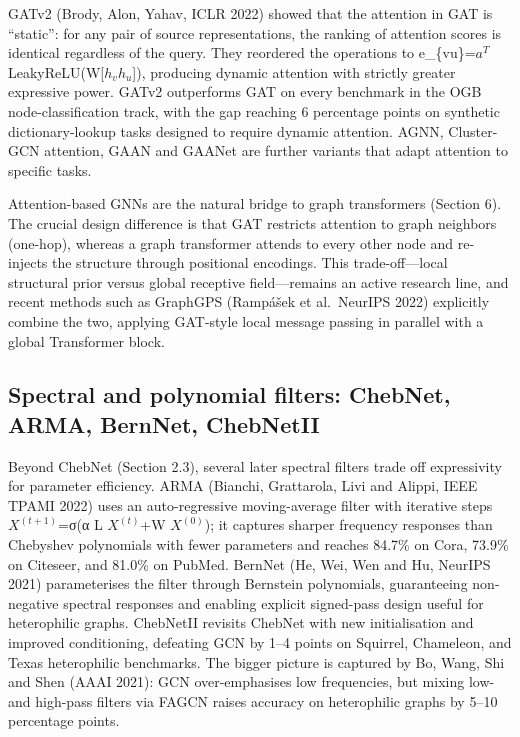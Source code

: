 GATv2 (Brody, Alon, Yahav, ICLR 2022) showed that the attention in GAT is ``static'': for any pair of source representations, the ranking of attention scores is identical regardless of the query. They reordered the operations to e\_\{vu\}=\(a^T\) LeakyReLU(W{[}\(h_v\)\textbar\textbar{}\(h_u\){]}), producing dynamic attention with strictly greater expressive power. GATv2 outperforms GAT on every benchmark in the OGB node-classification track, with the gap reaching 6 percentage points on synthetic dictionary-lookup tasks designed to require dynamic attention. AGNN, Cluster-GCN attention, GAAN and GAANet are further variants that adapt attention to specific tasks.

Attention-based GNNs are the natural bridge to graph transformers (Section 6). The crucial design difference is that GAT restricts attention to graph neighbors (one-hop), whereas a graph transformer attends to every other node and re-injects the structure through positional encodings. This trade-off---local structural prior versus global receptive field---remains an active research line, and recent methods such as GraphGPS (Rampášek et al.~NeurIPS 2022) explicitly combine the two, applying GAT-style local message passing in parallel with a global Transformer block.

\subsection{Spectral and polynomial filters: ChebNet, ARMA, BernNet, ChebNetII}\label{spectral-and-polynomial-filters-chebnet-arma-bernnet-chebnetii}

Beyond ChebNet (Section 2.3), several later spectral filters trade off expressivity for parameter efficiency. ARMA (Bianchi, Grattarola, Livi and Alippi, IEEE TPAMI 2022) uses an auto-regressive moving-average filter with iterative steps \(X^{(t+1)}\)=σ(α L \(X^{(t)}\)+W \(X^{(0)}\)); it captures sharper frequency responses than Chebyshev polynomials with fewer parameters and reaches 84.7\% on Cora, 73.9\% on Citeseer, and 81.0\% on PubMed. BernNet (He, Wei, Wen and Hu, NeurIPS 2021) parameterises the filter through Bernstein polynomials, guaranteeing non-negative spectral responses and enabling explicit signed-pass design useful for heterophilic graphs. ChebNetII revisits ChebNet with new initialisation and improved conditioning, defeating GCN by 1--4 points on Squirrel, Chameleon, and Texas heterophilic benchmarks. The bigger picture is captured by Bo, Wang, Shi and Shen (AAAI 2021): GCN over-emphasises low frequencies, but mixing low- and high-pass filters via FAGCN raises accuracy on heterophilic graphs by 5--10 percentage points.

